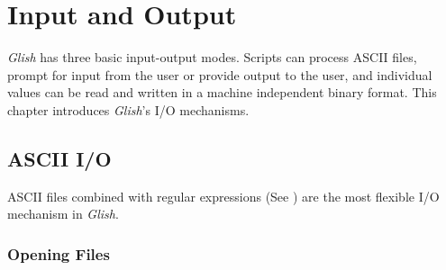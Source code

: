 
\chapter{Input and Output}
\label{io}

{\em Glish} has three basic input-output modes. Scripts can process ASCII files,
prompt for input from the user or provide output to the user, and individual
values can be read and written in a machine independent binary format. This chapter
introduces {\em Glish}'s I/O mechanisms.

\section{ASCII I/O}

ASCII files combined with regular expressions (See ) are the
most flexible I/O mechanism in {\em Glish}.

\subsection{Opening Files}

